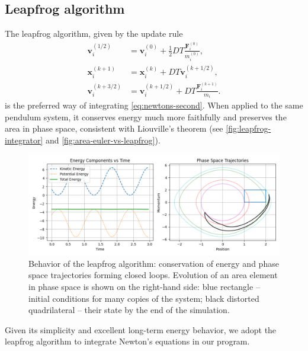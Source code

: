 \subsection{Leapfrog algorithm}
The leapfrog algorithm, given by the update rule \cite{young_leapfrog_2019}
\begin{equation}\label{eq:leapfrog}
    \begin{aligned}
        \mathbf{v}_{i}^{(1/2)} & = \mathbf{v}_i^{(0)} + \frac{1}{2}DT \frac{\mathbf{F}_i^{(0)}}{ m_i^{(0)}}, \\
        \mathbf{x}_i^{(k+1)}   & = \mathbf{x}_i^{(k)} + DT \mathbf{v}_i^{(k+1/2)},                           \\
        \mathbf{v}_i^{(k+3/2)} & = \mathbf{v}_i^{(k+1/2)} + DT \frac{ \mathbf{F}_i^{(k+1)}}{m_i}.
    \end{aligned}
\end{equation}
is the preferred way of integrating \autoref{eq:newtons-second}.
When applied to the same pendulum system, it conserves energy much more faithfully and preserves the area in phase space, consistent with Liouville's theorem (see \autoref{fig:leapfrog-integrator} and \autoref{fig:area-euler-vs-leapfrog}).
\begin{figure}[htp]
    \centering
    \includegraphics[scale=0.6]{img/integrators/leapfrog-pendulum.png}
    \caption{Behavior of the leapfrog algorithm: conservation of energy and phase space trajectories forming closed loops.
        Evolution of an area element in phase space is shown on the right-hand side: blue rectangle -- initial conditions for many copies of the system; black distorted quadrilateral -- their state by the end of the simulation.}
    \label{fig:leapfrog-integrator}
\end{figure}
Given its simplicity and excellent long-term energy behavior, we adopt the leapfrog algorithm to integrate Newton's equations in our program.